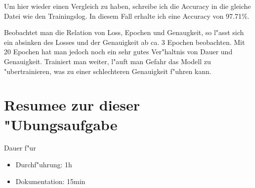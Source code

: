 \documentclass[a4paper,11pt,titlepage]{article}
\begin{document}
    Um hier wieder einen Vergleich zu haben, schreibe ich die Accuracy in die gleiche Datei wie den Trainingslog.
    In diesem Fall erhalte ich eine Accuracy von 97.71\%.

    Beobachtet man die Relation von Loss, Epochen und Genaugkeit, so l"asst sich ein absinken des Losses und der Genauigkeit ab ca. 3 Epochen beobachten.
    Mit 20 Epochen hat man jedoch noch ein sehr gutes Ver"haltnis von Dauer und Genauigkeit.
    Trainiert man weiter, l"auft man Gefahr das Modell zu "ubertrainieren, was zu einer schlechteren Genauigkeit f"uhren kann.

    \section{Resumee zur dieser "Ubungsaufgabe}
    Dauer f"ur
    \begin{itemize}
        \item Durchf"uhrung: 1h
        \item Dokumentation: 15min
    \end{itemize}

    \begin{thebibliography}{99}
    \end{thebibliography}
\end{document}
